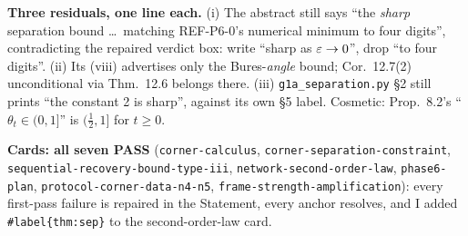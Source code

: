 \documentclass[11pt]{article}
\theoremstyle{definition}\newtheorem{example}[theorem]{Example}
\begin{document}
\textbf{Three residuals, one line each.}  (i) The abstract still says ``the \emph{sharp}
separation bound \dots\ matching REF-P6-0's numerical minimum to four digits'', contradicting the
repaired verdict box: write ``sharp as $\varepsilon\to0$'', drop ``to four digits''.  (ii) Its (viii)
advertises only the Bures-\emph{angle} bound; Cor.~12.7(2) unconditional via Thm.~12.6 belongs
there.  (iii) \texttt{g1a\_separation.py} \S2 still prints ``the constant 2 is sharp'', against
its own \S5 label.  Cosmetic: Prop.~8.2's ``$\theta_t\in(0,1]$'' is $(\frac12,1]$ for $t\ge0$.

\textbf{Cards: all seven PASS} (\texttt{corner-calculus}, \texttt{corner-separation-constraint},
\texttt{sequential-recovery-bound-type-iii}, \texttt{network-second-order-law},
\texttt{phase6-plan}, \texttt{protocol-corner-data-n4-n5},
\texttt{frame-strength-amplification}): every first-pass failure is repaired in the Statement,
every anchor resolves, and I added \texttt{\#label\{thm:sep\}} to the second-order-law card.
\end{document}
